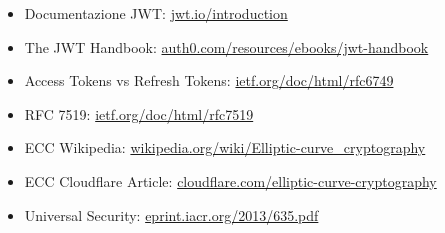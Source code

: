 \documentclass{article}
\begin{document}
\begin{itemize}
	\item Documentazione JWT: \href{https://jwt.io/introduction}{jwt.io/introduction}
	\item The JWT Handbook: \href{https://auth0.com/resources/ebooks/jwt-handbook}{auth0.com/resources/ebooks/jwt-handbook}
	\item Access Tokens vs Refresh Tokens: \href{https://datatracker.ietf.org/doc/html/rfc6749#section-1.4}{ietf.org/doc/html/rfc6749}
	\item RFC 7519: \href{https://datatracker.ietf.org/doc/html/rfc7519}{ietf.org/doc/html/rfc7519}
	\item ECC Wikipedia: \href{https://en.wikipedia.org/wiki/Elliptic-curve_cryptography}{wikipedia.org/wiki/Elliptic-curve\_cryptography}
	\item ECC Cloudflare Article: \href{https://blog.cloudflare.com/a-relatively-easy-to-understand-primer-on-elliptic-curve-cryptography/}{cloudflare.com/elliptic-curve-cryptography}
	\item Universal Security: \href{https://eprint.iacr.org/2013/635.pdf}{eprint.iacr.org/2013/635.pdf}
\end{itemize}
\end{document}
